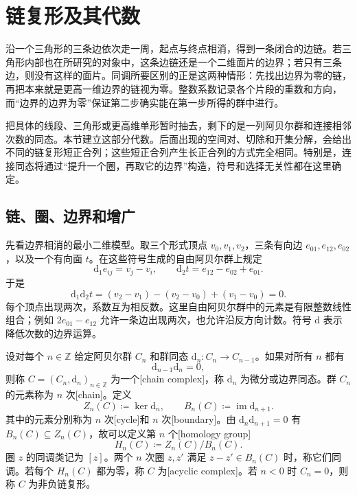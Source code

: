 
% 
% 

\section{链复形及其代数}
\label{g2:sec:0201}

沿一个三角形的三条边依次走一周，起点与终点相消，得到一条闭合的边链。若三角形内部也在所研究的对象中，这条边链还是一个二维面片的边界；若只有三条边，则没有这样的面片。同调所要区别的正是这两种情形：先找出边界为零的链，再把本来就是更高一维边界的链视为零。整数系数记录各个片段的重数和方向，而“边界的边界为零”保证第二步确实能在第一步所得的群中进行。

把具体的线段、三角形或更高维单形暂时抽去，剩下的是一列阿贝尔群和连接相邻次数的同态。本节建立这部分代数。后面出现的空间对、切除和开集分解，会给出不同的链复形短正合列；这些短正合列产生长正合列的方式完全相同。特别是，连接同态将通过“提升一个圈，再取它的边界”构造，符号和选择无关性都在这里确定。

\subsection{链、圈、边界和增广}
\label{g2:subsec:0201:01}
先看边界相消的最小二维模型。取三个形式顶点 \(v_0,v_1,v_2\)，三条有向边 \(e_{01},e_{12},e_{02}\)，以及一个有向面 \(t\)。在这些符号生成的自由阿贝尔群上规定
\[
	\mathrm{d}_1e_{ij}=v_j-v_i,\qquad
	\mathrm{d}_2t=e_{12}-e_{02}+e_{01}.
\]
于是
\[
	\mathrm{d}_1\mathrm{d}_2t
	=(v_2-v_1)-(v_2-v_0)+(v_1-v_0)=0.
\]
每个顶点出现两次，系数互为相反数。这里自由阿贝尔群中的元素是有限整数线性组合；例如 \(2e_{01}-e_{12}\) 允许一条边出现两次，也允许沿反方向计数。符号 \(\mathrm{d}\) 表示降低次数的边界运算。

\begin{definition}[链复形与同调]\label{g2:def:chain-complex}
	设对每个 \(n\in\mathbb Z\) 给定阿贝尔群 \(C_n\) 和群同态 \(\mathrm{d}_n:C_n\to C_{n-1}\)。如果对所有 \(n\) 都有
	\[
		\mathrm{d}_{n-1}\mathrm{d}_n=0,
	\]
	则称 \(C=(C_n,\mathrm{d}_n)_{n\in\mathbb Z}\) 为一个[chain complex]，称 \(\mathrm{d}_n\) 为微分或边界同态。群 \(C_n\) 的元素称为 \(n\) 次[chain]。定义
	\[
		Z_n(C)\coloneqq\ker\mathrm{d}_n,\qquad
		B_n(C)\coloneqq\operatorname{im}\mathrm{d}_{n+1}.
	\]
	其中的元素分别称为 \(n\) 次[cycle]和 \(n\) 次[boundary]。由 \(\mathrm{d}_n\mathrm{d}_{n+1}=0\) 有 \(B_n(C)\subseteq Z_n(C)\)，故可以定义第 \(n\) 个[homology group]
	\[
		H_n(C)\coloneqq Z_n(C)/B_n(C).
	\]
	圈 \(z\) 的同调类记为 \([z]\)。两个 \(n\) 次圈 \(z,z'\) 满足 \(z-z'\in B_n(C)\) 时，称它们同调。若每个 \(H_n(C)\) 都为零，称 \(C\) 为[acyclic complex]。若 \(n<0\) 时 \(C_n=0\)，则称 \(C\) 为非负链复形。
\end{definition}

